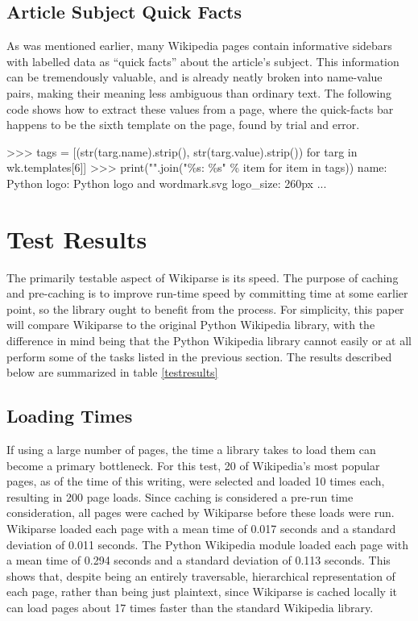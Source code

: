 
\subsection{Article Subject Quick Facts}

As was mentioned earlier, many Wikipedia pages contain informative sidebars with labelled data as ``quick facts'' about the article's subject. This information can be tremendously valuable, and is already neatly broken into name-value pairs, making their meaning less ambiguous than ordinary text. The following code shows how to extract these values from a page, where the quick-facts bar happens to be the sixth template on the page, found by trial and error.

\begin{code}
>>> tags = [(str(targ.name).strip(), str(targ.value).strip()) for targ in wk.templates[6]]
>>> print("\n".join("\%s: \%s" \% item for item in tags))
name: Python
logo: Python logo and wordmark.svg
logo_size: 260px
...
\end{code}


\section{Test Results}

The primarily testable aspect of Wikiparse is its speed. The purpose of caching and pre-caching is to improve run-time speed by committing time at some earlier point, so the library ought to benefit from the process. For simplicity, this paper will compare Wikiparse to the original Python Wikipedia library, with the difference in mind being that the Python Wikipedia library cannot easily or at all perform some of the tasks listed in the previous section. The results described below are summarized in table \ref{testresults}

\subsection{Loading Times}

If using a large number of pages, the time a library takes to load them can become a primary bottleneck. For this test, 20 of Wikipedia's most popular pages, as of the time of this writing, were selected and loaded 10 times each, resulting in 200 page loads. Since caching is considered a pre-run time consideration, all pages were cached by Wikiparse before these loads were run. Wikiparse loaded each page with a mean time of 0.017 seconds and a standard deviation of 0.011 seconds. The Python Wikipedia module loaded each page with a mean time of 0.294 seconds and a standard deviation of 0.113 seconds. This shows that, despite being an entirely traversable, hierarchical representation of each page, rather than being just plaintext, since Wikiparse is cached locally it can load pages about 17 times faster than the standard Wikipedia library.

